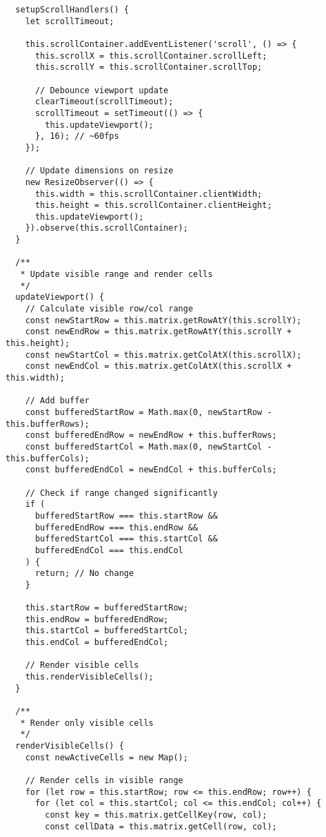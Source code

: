 \documentclass[11pt]{article}
\begin{document}
\begin{verbatim}
  setupScrollHandlers() {
    let scrollTimeout;
    
    this.scrollContainer.addEventListener('scroll', () => {
      this.scrollX = this.scrollContainer.scrollLeft;
      this.scrollY = this.scrollContainer.scrollTop;
      
      // Debounce viewport update
      clearTimeout(scrollTimeout);
      scrollTimeout = setTimeout(() => {
        this.updateViewport();
      }, 16); // ~60fps
    });
    
    // Update dimensions on resize
    new ResizeObserver(() => {
      this.width = this.scrollContainer.clientWidth;
      this.height = this.scrollContainer.clientHeight;
      this.updateViewport();
    }).observe(this.scrollContainer);
  }
  
  /**
   * Update visible range and render cells
   */
  updateViewport() {
    // Calculate visible row/col range
    const newStartRow = this.matrix.getRowAtY(this.scrollY);
    const newEndRow = this.matrix.getRowAtY(this.scrollY + this.height);
    const newStartCol = this.matrix.getColAtX(this.scrollX);
    const newEndCol = this.matrix.getColAtX(this.scrollX + this.width);
    
    // Add buffer
    const bufferedStartRow = Math.max(0, newStartRow - this.bufferRows);
    const bufferedEndRow = newEndRow + this.bufferRows;
    const bufferedStartCol = Math.max(0, newStartCol - this.bufferCols);
    const bufferedEndCol = newEndCol + this.bufferCols;
    
    // Check if range changed significantly
    if (
      bufferedStartRow === this.startRow &&
      bufferedEndRow === this.endRow &&
      bufferedStartCol === this.startCol &&
      bufferedEndCol === this.endCol
    ) {
      return; // No change
    }
    
    this.startRow = bufferedStartRow;
    this.endRow = bufferedEndRow;
    this.startCol = bufferedStartCol;
    this.endCol = bufferedEndCol;
    
    // Render visible cells
    this.renderVisibleCells();
  }
  
  /**
   * Render only visible cells
   */
  renderVisibleCells() {
    const newActiveCells = new Map();
    
    // Render cells in visible range
    for (let row = this.startRow; row <= this.endRow; row++) {
      for (let col = this.startCol; col <= this.endCol; col++) {
        const key = this.matrix.getCellKey(row, col);
        const cellData = this.matrix.getCell(row, col);
        

\end{verbatim}
\end{document}

